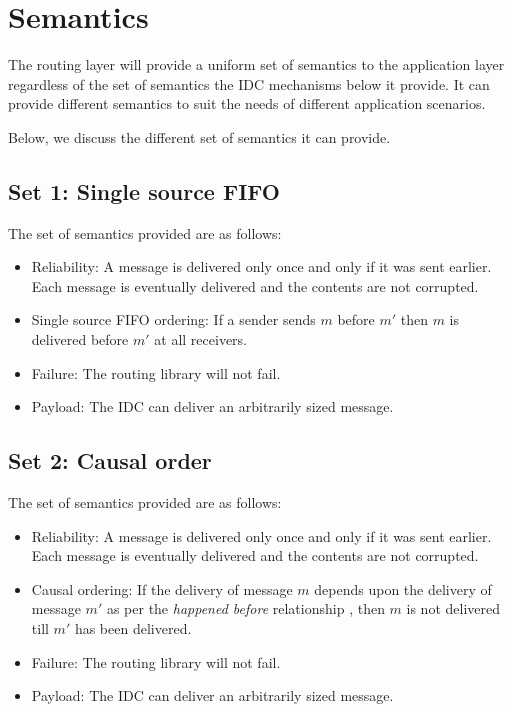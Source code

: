 \documentclass[a4paper,twoside]{report} %
\begin{document}
\section{Semantics}\label{sec:semantics}

The routing layer will provide a uniform set of semantics to the
application layer regardless of the set of semantics the
IDC mechanisms below it provide.
It can provide different semantics to suit the
needs of different application scenarios.

Below, we discuss the different set of semantics it can provide.

\subsection{Set 1: Single source FIFO}
The set of semantics provided are as follows:

\begin{itemize}
\item Reliability:
  A message is delivered only once and only if it was sent earlier.
  Each message is eventually delivered and the contents are not corrupted.
\item Single source FIFO ordering:
  If a sender sends $m$ before $m'$ then $m$ is delivered before $m'$
  at all receivers.
\item Failure:
  The routing library will not fail.
\item Payload:
  The IDC can deliver an arbitrarily sized message.
\end{itemize}

\subsection{Set 2: Causal order}
The set of semantics provided are as follows:

\begin{itemize}
\item Reliability:
  A message is delivered only once and only if it was sent earlier.
  Each message is eventually delivered and the contents are not corrupted.
\item Causal ordering:
  If the delivery of message $m$ depends upon the delivery of message $m'$ as
  per the \emph{happened before} relationship \cite{events-time},
  then $m$ is not delivered till $m'$ has been delivered.
\item Failure:
  The routing library will not fail.
\item Payload:
  The IDC can deliver an arbitrarily sized message.
\end{itemize}
\end{document}
